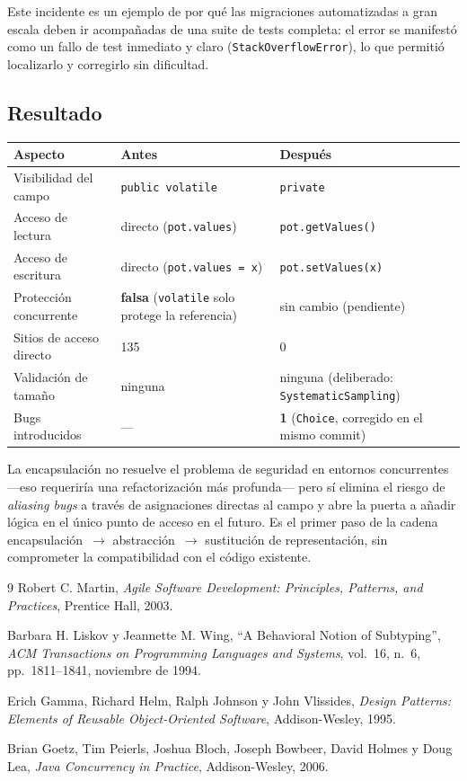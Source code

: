 \documentclass[11pt,a4paper]{article}
\newcommand{\code}[1]{\texttt{#1}}
\newcommand{\bad}[1]{\textcolor{codered}{\textbf{#1}}}
\newcommand{\warn}[1]{\textcolor{warnorange}{\textbf{#1}}}
\begin{document}
Este incidente es un ejemplo de por qué las migraciones automatizadas
a gran escala deben ir acompañadas de una suite de tests completa: el
error se manifestó como un fallo de test inmediato y claro
(\code{StackOverflowError}), lo que permitió localizarlo y corregirlo
sin dificultad.

\subsection{Resultado}

\begin{center}
\begin{tabular}{lll}
\toprule
\textbf{Aspecto} & \textbf{Antes} & \textbf{Después} \\
\midrule
Visibilidad del campo   & \code{public volatile} & \code{private} \\
Acceso de lectura       & directo (\code{pot.values})   & \code{pot.getValues()} \\
Acceso de escritura     & directo (\code{pot.values = x}) & \code{pot.setValues(x)} \\
Protección concurrente  & \bad{falsa} (\code{volatile} solo protege la referencia) & sin cambio (pendiente) \\
Sitios de acceso directo & 135 & 0 \\
Validación de tamaño    & ninguna & ninguna (deliberado: \code{SystematicSampling}) \\
Bugs introducidos       & --- & \warn{1} (\code{Choice}, corregido en el mismo commit) \\
\bottomrule
\end{tabular}
\end{center}

La encapsulación no resuelve el problema de seguridad en entornos
concurrentes ---eso requeriría una refactorización más profunda--- pero
sí elimina el riesgo de \emph{aliasing bugs} a través de asignaciones
directas al campo y abre la puerta a añadir lógica en el único punto
de acceso en el futuro.  Es el primer paso de la cadena
encapsulación~$\to$ abstracción~$\to$ sustitución de representación,
sin comprometer la compatibilidad con el código existente.

\begin{thebibliography}{9}
  Robert C. Martin,
  \emph{Agile Software Development: Principles, Patterns, and Practices},
  Prentice Hall, 2003.

  Barbara H. Liskov y Jeannette M. Wing,
  ``A Behavioral Notion of Subtyping'',
  \emph{ACM Transactions on Programming Languages and Systems},
  vol.~16, n.~6, pp.~1811--1841, noviembre de 1994.

  Erich Gamma, Richard Helm, Ralph Johnson y John Vlissides,
  \emph{Design Patterns: Elements of Reusable Object-Oriented Software},
  Addison-Wesley, 1995.

  Brian Goetz, Tim Peierls, Joshua Bloch, Joseph Bowbeer, David Holmes y
  Doug Lea,
  \emph{Java Concurrency in Practice},
  Addison-Wesley, 2006.
\end{thebibliography}
\end{document}
